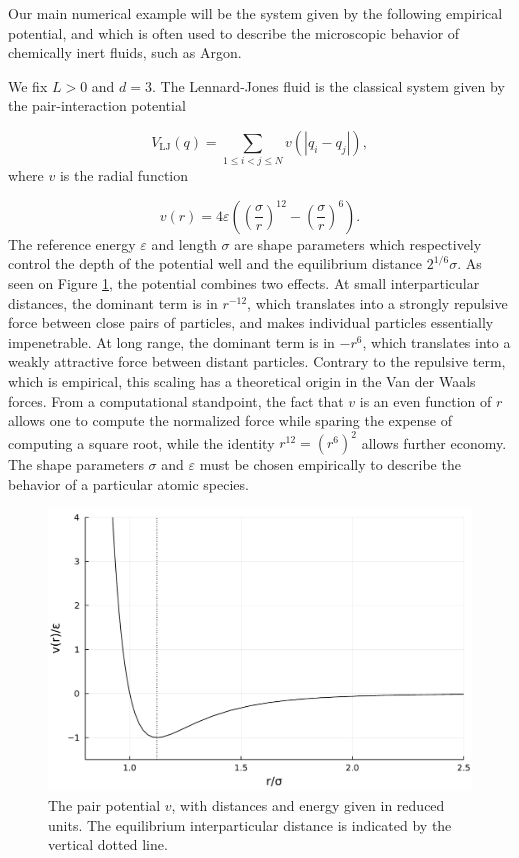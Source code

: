  Our main numerical example will be the system given by the following empirical potential, and which is often used to describe the microscopic behavior of chemically inert fluids, such as Argon.

 \begin{example}
    We fix $L>0$ and $d=3$. The Lennard-Jones fluid is the classical system given by the pair-interaction potential

    \begin{equation}
        \label{eq:lennard_jones}
        V_{\mathrm{LJ}}(q)=\sum_{1\leq i < j \leq N} v(|q_i-q_j|),        
    \end{equation}
    where $v$ is the radial function

    $$v(r)=4\varepsilon \left( \left( \frac{\sigma}{r}\right)^{12}-\left(\frac{\sigma}{r} \right)^6\right).$$
    The reference energy $\varepsilon$ and length $\sigma$ are shape parameters which respectively control the depth of the potential well and the equilibrium distance $2^{1/6}\sigma$.
    As seen on Figure \ref{fig:lennard_jones}, the potential combines two effects. At small interparticular distances, the dominant term is in $r^{-12}$, which translates into a strongly repulsive force between close pairs of particles, and makes individual particles essentially impenetrable.
    At long range, the dominant term is in $-r^6$, which translates into a weakly attractive force between distant particles. Contrary to the repulsive term, which is empirical, this scaling has a theoretical origin in the Van der Waals forces.
    From a computational standpoint, the fact that $v$ is an even function of $r$ allows one to compute the normalized force while sparing the expense of computing a square root, while the identity $r^{12}=(r^6)^2$ allows further economy.
    The shape parameters $\sigma$ and $\varepsilon$ must be chosen empirically to describe the behavior of a particular atomic species.
 \end{example}

 \begin{figure}[htbp]
    \begin{center}
      \includegraphics[width=0.7\linewidth]{figures/chapter1/lennard_jones.pdf}
      \caption{ \label{fig:lennard_jones}
        The pair potential $v$, with distances and energy given in reduced units. The equilibrium interparticular distance is indicated by the vertical dotted line.
      }
    \end{center}
  \end{figure}

